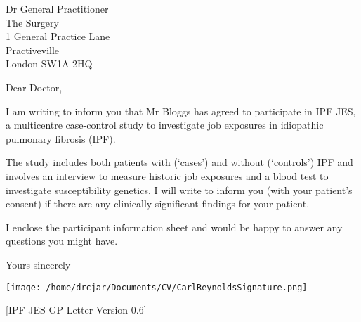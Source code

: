\documentclass[imperial,letterpaper,pagesize,UScommercial9]{scrlttr2}
\begin{document}
\begin{letter}{Dr General Practitioner \\ The Surgery \\ 1 General Practice Lane \\ Practiveville \\ London SW1A 2HQ}


\opening{Dear Doctor,}

    I am writing to inform you that Mr Bloggs has agreed to participate in IPF JES, a multicentre case-control study to investigate job exposures in idiopathic pulmonary fibrosis (IPF).
    
    The study includes both patients with (`cases') and without (`controls') IPF and involves an interview to measure historic job exposures and a blood test to investigate susceptibility genetics. I will write to inform you (with your patient's consent) if there are any clinically significant findings for your patient. 
    
    I enclose the participant information sheet and would be happy to answer any questions you might have.




\closing{Yours sincerely}

    \texttt{[image: /home/drcjar/Documents/CV/CarlReynoldsSignature.png]}

    \vfill \hfill [IPF JES GP Letter Version 0.6]

\end{letter}
\end{document}
